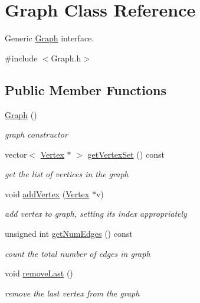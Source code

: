 \hypertarget{class_graph}{}\section{Graph Class Reference}
\label{class_graph}


Generic \hyperlink{class_graph}{Graph} interface.  




{\ttfamily \#include $<$Graph.\+h$>$}

\subsection*{Public Member Functions}
\begin{DoxyCompactItemize}
\item 
\hypertarget{class_graph_ae4c72b8ac4d693c49800a4c7e273654f}{}\hyperlink{class_graph_ae4c72b8ac4d693c49800a4c7e273654f}{Graph} ()\label{class_graph_ae4c72b8ac4d693c49800a4c7e273654f}

\begin{DoxyCompactList}\small\item\em graph constructor \end{DoxyCompactList}\item 
vector$<$ \hyperlink{class_vertex}{Vertex} $\ast$ $>$ \hyperlink{class_graph_a4cca9b48f61d44104aa2ebc959a8728c}{get\+Vertex\+Set} () const 
\begin{DoxyCompactList}\small\item\em get the list of vertices in the graph \end{DoxyCompactList}\item 
void \hyperlink{class_graph_aa95e129c42fe7150ee07d13377547324}{add\+Vertex} (\hyperlink{class_vertex}{Vertex} $\ast$v)
\begin{DoxyCompactList}\small\item\em add vertex to graph, setting its index appropriately \end{DoxyCompactList}\item 
unsigned int \hyperlink{class_graph_a89fc060f50dc936026dea4c334dd86b1}{get\+Num\+Edges} () const 
\begin{DoxyCompactList}\small\item\em count the total number of edges in graph \end{DoxyCompactList}\item 
\hypertarget{class_graph_a0d0be9182f1ff998b46122873a7d6cae}{}void \hyperlink{class_graph_a0d0be9182f1ff998b46122873a7d6cae}{remove\+Last} ()\label{class_graph_a0d0be9182f1ff998b46122873a7d6cae}

\begin{DoxyCompactList}\small\item\em remove the last vertex from the graph \end{DoxyCompactList}\end{DoxyCompactItemize}


